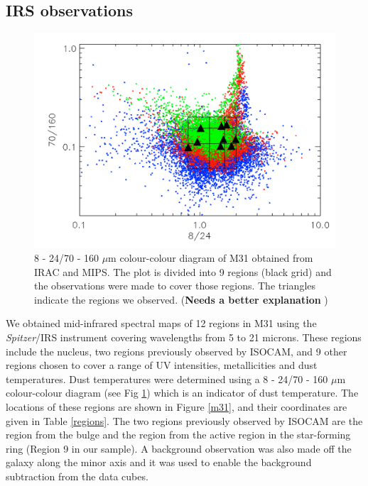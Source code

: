 \subsection{IRS observations}


\begin{figure}
\centering
\includegraphics[width = 8 cm]{./colormaps.png}
\caption{8 - 24/70 - 160 $\mu$m colour-colour diagram of M31 obtained from IRAC and MIPS. The plot is divided into 9 regions (black grid) and the observations were made to cover those regions. The triangles indicate the regions we observed. ({\bf Needs a better explanation} )}
\label{colourmaps}
\end{figure}

We obtained mid-infrared spectral maps of 12 regions in M31 using the {\em Spitzer}/IRS instrument \citep{IRS2004} covering wavelengths from 5 to 21 microns. These regions include the nucleus, two regions previously observed by ISOCAM, and 9 other regions chosen to cover a range of UV intensities, metallicities and dust temperatures. Dust temperatures were determined using a 8 - 24/70 - 160 $\mu$m colour-colour diagram (see Fig \ref{colourmaps}) which is an indicator of dust temperature. The locations of these regions are shown in Figure \ref{m31}, and their coordinates are given in Table \ref{regions}. The two regions previously observed by ISOCAM are the region from the bulge and the region from the active region in the star-forming ring (Region 9 in our sample). A background observation was also made off the galaxy along the minor axis and it was used to enable the background subtraction from the data cubes.



